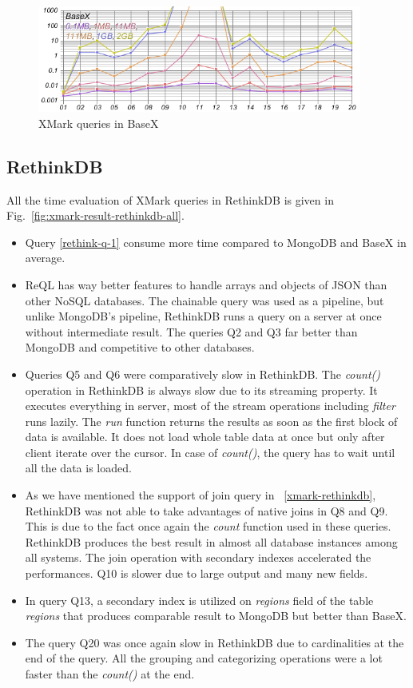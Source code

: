 \begin{figure}[hbt]
	\centering
	\includegraphics[width=0.95\textwidth]{img/result/basex/basex-all}
	\caption{XMark queries in BaseX}
	\label{fig:xmark-result-basex-all}
\end{figure}

\subsection{RethinkDB}
All the time evaluation of XMark queries in RethinkDB is given in Fig.~\ref{fig:xmark-result-rethinkdb-all}. 
\begin{itemize}
\item Query \ref{rethink-q-1} consume more time compared to MongoDB and BaseX in average. 
 \item  
  ReQL has way better features  to handle arrays and objects of JSON than other NoSQL databases. The chainable query was used as a pipeline, but unlike MongoDB's pipeline, RethinkDB runs a query on a server at once without intermediate result. The queries Q2 and Q3 far better than MongoDB and competitive to other databases. 
 \item
 Queries Q5 and Q6 were comparatively slow in  RethinkDB. The \textit{count()} operation in RethinkDB is always slow due to its streaming property. It executes everything in server, most of the stream operations including \textit{filter} runs lazily. The \textit{run} function returns the results as soon as the first block of data is available. It does not load whole table data  at once but only after client iterate over the cursor. In case of \textit{count()}, the query has to wait until all the data is loaded.
 
 
 \item As we have mentioned the support of join query in ~\ref{xmark-rethinkdb}, RethinkDB was not able to take advantages of native joins in Q8 and Q9. This is due to the fact once again the \textit{count} function used in these queries. 
 RethinkDB produces the best result in almost all database instances among all systems. The join operation with secondary indexes accelerated the performances. Q10 is slower due to large output and many new fields. 

\item In query Q13,  a secondary index is utilized on \textit{regions} field of the table \textit{regions} that produces comparable result to MongoDB but better than BaseX.  

\item The query Q20 was once again slow in RethinkDB due to cardinalities at the end of the query. All the grouping and categorizing operations were a lot faster than the \textit{count()} at the end. 
\end{itemize}

